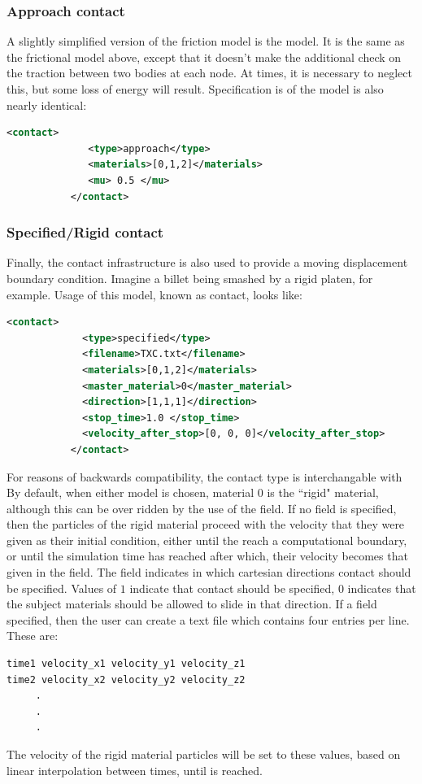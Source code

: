 \subsubsection{Approach contact}
A slightly simplified version of the friction model is the
 model.  It is the same as the frictional model
above, except that it doesn't make the additional check on the traction
between two bodies at each node.  At times, it is necessary to neglect this,
but some loss of energy will result.  Specification is of the model is 
also nearly identical:

\begin{lstlisting}[language=XML]
           <contact>
              <type>approach</type>
              <materials>[0,1,2]</materials>
              <mu> 0.5 </mu>
           </contact>
\end{lstlisting}

\subsubsection{Specified/Rigid contact}
Finally, the contact infrastructure is also used to provide a moving
displacement boundary condition.  Imagine a billet being smashed by a
rigid platen, for example.  Usage of this model, known as
 contact, looks like:

\begin{lstlisting}[language=XML]
           <contact>
             <type>specified</type>
             <filename>TXC.txt</filename>
             <materials>[0,1,2]</materials>
             <master_material>0</master_material>
             <direction>[1,1,1]</direction>
             <stop_time>1.0 </stop_time>
             <velocity_after_stop>[0, 0, 0]</velocity_after_stop>
           </contact>
\end{lstlisting}
For reasons of backwards compatibility, the
 contact type is interchangable with
  By default, when either model is
chosen, material 0 is the ``rigid" material, although this can be
over ridden by the use of the
 field.  If no
 field is specified, then the particles of the
rigid material proceed with the velocity that they were given as their
initial condition, either until the reach a computational boundary, or
until the simulation time has reached  after
which, their velocity becomes that given in the
 field.  The 
field indicates in which cartesian directions contact should be specified.
Values of $1$ indicate that contact should be specified, $0$ indicates that
the subject materials should be allowed to slide in that direction.  If
a  field  specified, then the user can
create a text file which contains four entries per line.  These are:
\begin{lstlisting}[backgroundcolor=\color{background}]
time1 velocity_x1 velocity_y1 velocity_z1
time2 velocity_x2 velocity_y2 velocity_z2
     .
     .
     .
\end{lstlisting}
The velocity of the rigid material particles will be set to these values,
based on linear interpolation between times, until 
is reached.  

